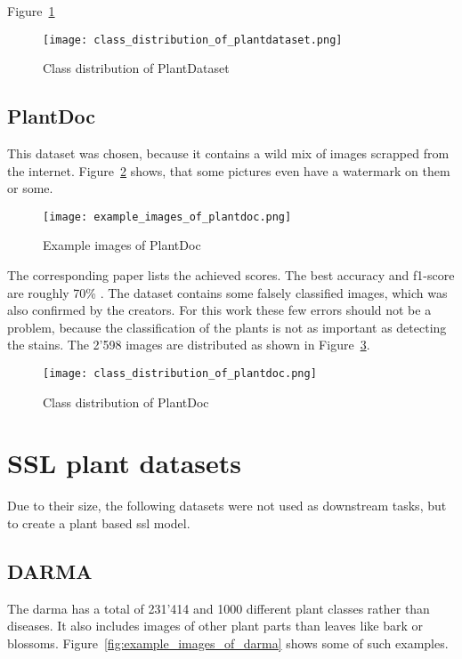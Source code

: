 Figure~\ref{fig:class_distribution_of_plantdataset}
\begin{figure}[H]
    \begin{center}
    \texttt{[image: class\_distribution\_of\_plantdataset.png]}
    \caption{Class distribution of PlantDataset}\label{fig:class_distribution_of_plantdataset}
    \end{center}
\end{figure}

\subsection{PlantDoc}
This dataset was chosen, because it contains a wild mix of images scrapped from the internet. 
Figure~\ref{fig:example_images_of_plantdoc} shows, that some pictures even have a watermark on them or some.
\begin{figure}[H]
    \begin{center}
    \texttt{[image: example\_images\_of\_plantdoc.png]}
    \caption{Example images of PlantDoc}\label{fig:example_images_of_plantdoc}
    \end{center}
\end{figure}
The corresponding paper lists the achieved scores. 
The best accuracy and f1-score are roughly 70\% \autocite{singh2020}. 
The dataset contains some falsely classified images, which was also confirmed by the creators. 
For this work these few errors should not be a problem, because the classification of the plants is not as important as detecting the stains.
The 2'598 images are distributed as shown in Figure~\ref{fig:class_distribution_of_plantdoc}.

\begin{figure}[H]
    \begin{center}
    \texttt{[image: class\_distribution\_of\_plantdoc.png]}
    \caption{Class distribution of PlantDoc}\label{fig:class_distribution_of_plantdoc}
    \end{center}
\end{figure}

\section{SSL plant datasets}
Due to their size, the following datasets were not used as downstream tasks, but to create a plant based \gls{ssl} model. 
\subsection{DARMA}
The \gls{darma} has a total of 231'414 and 1000 different plant classes rather than diseases. 
It also includes images of other plant parts than leaves like bark or blossoms. 
Figure~\ref{fig:example_images_of_darma} shows some of such examples.

